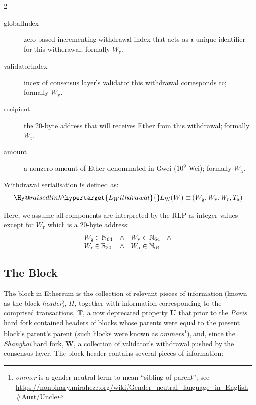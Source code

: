 \documentclass[9pt,oneside]{amsart}
\makeatletter
\newcommand{\linkdest}[1]{\Hy@raisedlink{\hypertarget{#1}{}}}
\makeatother
\begin{document}
\begin{multicols}{2}
\begin{description}
\item[globalIndex] zero based incrementing withdrawal index that acts as a unique identifier for this withdrawal; formally $W_{\mathrm{g}}$.
\item[validatorIndex] index of consensus layer's validator this withdrawal corresponds to; formally $W_{\mathrm{v}}$.
\item[recipient] the 20-byte address that will receives Ether from this withdrawal; formally $W_{\mathrm{r}}$.
\item[amount] a nonzero amount of Ether denominated in Gwei ($10^9$ Wei); formally $W_{\mathrm{a}}$.
\end{description}

Withdrawal serialisation is defined as:
\begin{equation}
\linkdest{L_Withdrawal} L_{\mathrm{W}}(W) \equiv 
(W_{\mathrm{g}}, W_{\mathrm{v}}, W_{\mathrm{r}}, T_{\mathrm{a}})
\end{equation}

Here, we assume all components are interpreted by the RLP as integer values except for $W_\mathbf{r}$ which is a 20-byte address:
\begin{equation}
\begin{array}[t]{lclc}
W_{\mathrm{g}} \in \mathbb{N}_{64} & \wedge & W_{\mathrm{v}} \in \mathbb{N}_{64} & \wedge \\
W_{\mathrm{r}} \in \mathbb{B}_{20} & \wedge & W_{\mathrm{a}} \in \mathbb{N}_{64}
\end{array}
\end{equation}

\subsection{The Block}\linkdest{block}\label{subsec:The_Block}

The block in Ethereum is the collection of relevant pieces of information (known as the block \textit{header}), $H$, together with information corresponding to the comprised transactions,
$\mathbf{T}$,\hypertarget{ommerheaders}{} a now deprecated property $\mathbf{U}$ that prior to the \textit{Paris} hard fork contained headers of blocks whose parents were equal to the present block's parent's parent (such blocks were known as \textit{ommers}\footnote{\textit{ommer} is a gender-neutral term to mean ``sibling of parent''; see \url{https://nonbinary.miraheze.org/wiki/Gender_neutral_language_in_English\#Aunt/Uncle}}),
and, since the \textit{Shanghai} hard fork, $\mathbf{W}$, a collection of validator's withdrawal pushed by the consensus layer. The block header contains several pieces of information:


\end{multicols}
\end{document}
